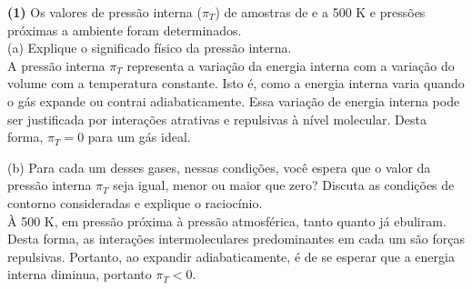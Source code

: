 \textbf{(1)} Os valores de pressão interna (\(\pi_T\)) de amostras de  e
 a 500 K e pressões próximas a ambiente foram determinados.\\

(a) Explique o significado físico da pressão interna.\\

   A pressão interna \( \pi_T \) representa a variação da energia interna com a
   variação do volume com a temperatura constante. Isto é, como a energia
   interna varia quando o gás expande ou contrai adiabaticamente. Essa variação
   de energia interna pode ser justificada por interações atrativas e repulsivas
   à nível molecular. Desta forma, \( \pi_T = 0 \) para um gás ideal. 

(b) Para cada um desses gases, nessas condições, você espera que o valor da
pressão interna \(\pi_T\)  seja igual, menor ou maior que zero? Discuta as
condições de contorno consideradas e explique o raciocínio.\\

    À 500 K, em pressão próxima à pressão atmosférica, tanto  quanto  já ebuliram. Desta forma, as
    interações intermoleculares predominantes em cada um são forças repulsivas.
    Portanto, ao expandir adiabaticamente, é de se esperar que a energia interna
    diminua, portanto \( \pi_T < 0 \).  
